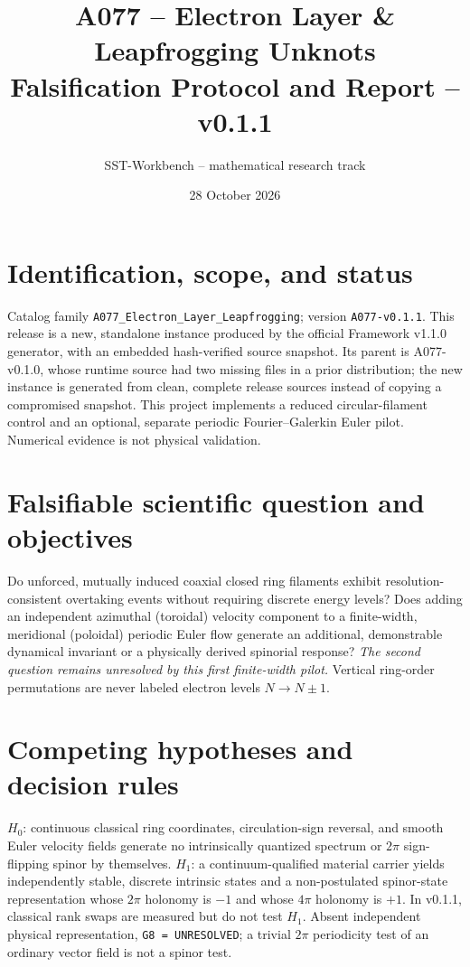 \documentclass[10pt,a4paper]{article}
\title{A077 -- Electron Layer \& Leapfrogging Unknots\\\large Falsification Protocol and Report -- v0.1.1}
\author{SST-Workbench -- mathematical research track}
\date{28 October 2026}
\begin{document}
\maketitle
\noindent{}

\section{Identification, scope, and status}
Catalog family \texttt{A077\_Electron\_Layer\_Leapfrogging}; version \texttt{A077-v0.1.1}. This release is a new, standalone instance produced by the official Framework v1.1.0 generator, with an embedded hash-verified source snapshot. Its parent is A077-v0.1.0, whose runtime source had two missing files in a prior distribution; the new instance is generated from clean, complete release sources instead of copying a compromised snapshot. This project implements a reduced circular-filament control and an optional, separate periodic Fourier--Galerkin Euler pilot. Numerical evidence is not physical validation.

\section{Falsifiable scientific question and objectives}
Do unforced, mutually induced coaxial closed ring filaments exhibit resolution-consistent overtaking events without requiring discrete energy levels? Does adding an independent azimuthal (toroidal) velocity component to a finite-width, meridional (poloidal) periodic Euler flow generate an additional, demonstrable dynamical invariant or a physically derived spinorial response? \emph{The second question remains unresolved by this first finite-width pilot.} Vertical ring-order permutations are never labeled electron levels $N\to N\pm1$.

\section{Competing hypotheses and decision rules}
$H_0$: continuous classical ring coordinates, circulation-sign reversal, and smooth Euler velocity fields generate no intrinsically quantized spectrum or $2\pi$ sign-flipping spinor by themselves. $H_1$: a continuum-qualified material carrier yields independently stable, discrete intrinsic states and a non-postulated spinor-state representation whose $2\pi$ holonomy is $-1$ and whose $4\pi$ holonomy is $+1$. In v0.1.1, classical rank swaps are measured but do not test $H_1$. Absent independent physical representation, \texttt{G8 = UNRESOLVED}; a trivial $2\pi$ periodicity test of an ordinary vector field is not a spinor test.
\end{document}
